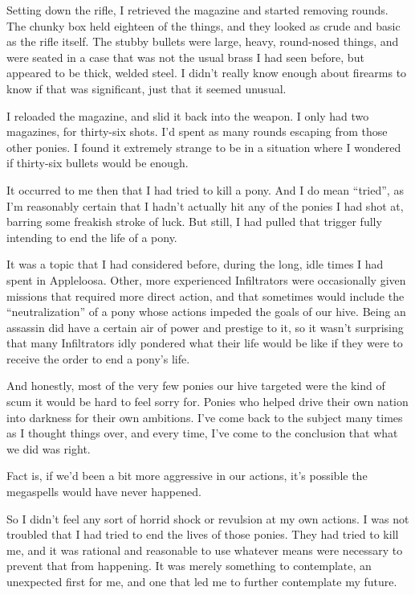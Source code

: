 Setting down the rifle, I retrieved the magazine and started removing rounds. The chunky box held eighteen of the things, and they looked as crude and basic as the rifle itself. The stubby bullets were large, heavy, round-nosed things, and were seated in a case that was not the usual brass I had seen before, but appeared to be thick, welded steel. I didn’t really know enough about firearms to know if that was significant, just that it seemed unusual.

I reloaded the magazine, and slid it back into the weapon. I only had two magazines, for thirty-six shots. I’d spent as many rounds escaping from those other ponies. I found it extremely strange to be in a situation where I wondered if thirty-six bullets would be enough.

It occurred to me then that I had tried to kill a pony. And I do mean “tried”, as I’m reasonably certain that I hadn’t actually hit any of the ponies I had shot at, barring some freakish stroke of luck. But still, I had pulled that trigger fully intending to end the life of a pony.

It was a topic that I had considered before, during the long, idle times I had spent in Appleloosa. Other, more experienced Infiltrators were occasionally given missions that required more direct action, and that sometimes would include the “neutralization” of a pony whose actions impeded the goals of our hive. Being an assassin did have a certain air of power and prestige to it, so it wasn’t surprising that many Infiltrators idly pondered what their life would be like if they were to receive the order to end a pony’s life.

And honestly, most of the very few ponies our hive targeted were the kind of scum it would be hard to feel sorry for. Ponies who helped drive their own nation into darkness for their own ambitions. I’ve come back to the subject many times as I thought things over, and every time, I’ve come to the conclusion that what we did was right.

Fact is, if we’d been a bit more aggressive in our actions, it’s possible the megaspells would have never happened.

So I didn’t feel any sort of horrid shock or revulsion at my own actions. I was not troubled that I had tried to end the lives of those ponies. They had tried to kill me, and it was rational and reasonable to use whatever means were necessary to prevent that from happening. It was merely something to contemplate, an unexpected first for me, and one that led me to further contemplate my future.

